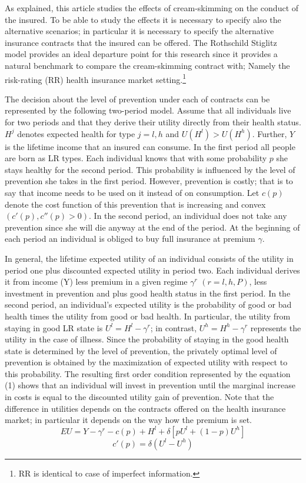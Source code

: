 \documentclass[12pt,english]{article}%
\makeatletter
\renewcommand{\section}{\@startsection{section}{1}{0mm}{-1.5\baselineskip}{0.8\baselineskip}{\normalfont\large\centering}}
\makeatother
\begin{document}
\section{Level of prevention under various contracts}
As explained, this article studies the effects of cream-skimming on the conduct of the insured. To be able to study the effects it is necessary to specify also the alternative scenarios; in particular it is necessary to specify the alternative insurance contracts that the insured can be offered. The Rothschild Stiglitz model \citep{rotschild1976} provides an ideal departure point for this research since it provides a natural benchmark to compare the cream-skimming contract with; Namely the risk-rating (RR) health insurance market setting.\footnote{RR is identical to case of imperfect information.}   

The decision about the level of prevention under each of contracts can be represented by the following two-period model. Assume that all individuals live for two periods and that they derive their utility directly from their health status. $H^j$ denotes expected health for type $j=l,h$ and $U(H^l)>U(H^h)$. Further, $Y$ is the lifetime income that an insured can consume. In the first period all people are born as LR types. Each individual knows that with some probability $p$ she stays healthy for the second period. This probability is influenced by the level of prevention she takes in the first period. However, prevention is costly; that is to say that income needs to be used on it instead of on consumption. Let $c(p)$ denote the cost function of this prevention that is increasing and convex $(c'(p),c''(p) >0)$. In the second period, an individual does not take any prevention since she will die anyway at the end of the period. At the beginning of each period an individual is obliged to buy full insurance at premium $\gamma$.

In general, the lifetime expected utility of an individual consists of the utility in period one plus discounted expected utility in period two. Each individual derives it from income (Y) less premium in a given regime $\gamma^r$ $(r=l, h, P)$, less investment in prevention and plus good health status in the first period. In the second period, an individual's expected utility is the probability of good or bad health times the utility from good or bad health. In particular, the utility from staying in good LR state is $U^l=H^l-\gamma^r$; in contrast, $U^h=H^h-\gamma^r$ represents the utility in the case of illness. Since the probability of staying in the good health state is determined by the level of prevention, the privately optimal level of prevention is obtained by the maximization of expected utility with respect to this probability. The resulting first order condition represented by the equation (1) shows that an individual will invest in prevention until the marginal increase in costs is equal to the discounted utility gain of prevention. Note that the difference in utilities depends on the contracts offered on the health insurance market; in particular it depends on the way how the premium is set.
$$EU=Y-\gamma^r-c(p)+H^l+\delta[pU^l+(1-p)U^h]$$
\begin{equation}
c'(p)=\delta(U^l-U^h)
\end{equation}
  
\end{document}
